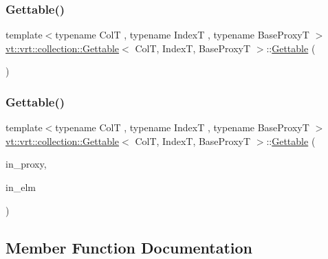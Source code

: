 \subsubsection{\texorpdfstring{Gettable()}{Gettable()}\hspace{0.1cm}{\footnotesize\ttfamily [1/2]}}
{\footnotesize\ttfamily template$<$typename ColT , typename IndexT , typename Base\+ProxyT $>$ \\
\hyperlink{structvt_1_1vrt_1_1collection_1_1_gettable}{vt\+::vrt\+::collection\+::\+Gettable}$<$ ColT, IndexT, Base\+ProxyT $>$\+::\hyperlink{structvt_1_1vrt_1_1collection_1_1_gettable}{Gettable} (\begin{DoxyParamCaption}{ }\end{DoxyParamCaption})\hspace{0.3cm}{\ttfamily [default]}}

\mbox{\label{structvt_1_1vrt_1_1collection_1_1_gettable_a20b5564b96f1e125fd0ae5b496cb47c9}} 
\subsubsection{\texorpdfstring{Gettable()}{Gettable()}\hspace{0.1cm}{\footnotesize\ttfamily [2/2]}}
{\footnotesize\ttfamily template$<$typename ColT , typename IndexT , typename Base\+ProxyT $>$ \\
\hyperlink{structvt_1_1vrt_1_1collection_1_1_gettable}{vt\+::vrt\+::collection\+::\+Gettable}$<$ ColT, IndexT, Base\+ProxyT $>$\+::\hyperlink{structvt_1_1vrt_1_1collection_1_1_gettable}{Gettable} (\begin{DoxyParamCaption}\item[{typename Base\+Proxy\+T\+::\+Proxy\+Type const \&}]{in\+\_\+proxy,  }\item[{typename Base\+Proxy\+T\+::\+Element\+Proxy\+Type const \&}]{in\+\_\+elm }\end{DoxyParamCaption})}



\subsection{Member Function Documentation}
\mbox{\label{structvt_1_1vrt_1_1collection_1_1_gettable_a0d35dc31fd50c0396f2fa0ba58f8f6ef}} 
